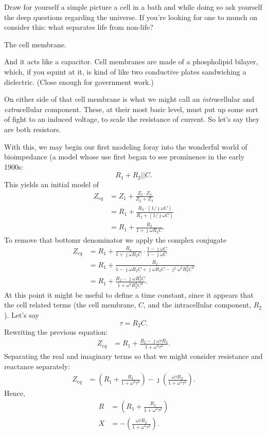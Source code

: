 \documentclass[11pt]{book}
\begin{document}
Draw for yourself a simple picture a cell in a bath and while doing so ask yourself the deep questions regarding the universe. If you're looking for one to munch on consider this: what separates life from non-life?

The cell membrane.

And it acts like a capacitor. Cell membranes are made of a phospholipid bilayer, which, if you squint at it, is kind of like two conductive plates sandwiching a dielectric. (Close enough for government work.) 

On either side of that cell membrane is what we might call an \textit{intra}cellular and \textit{extra}cellular component. These, at their most basic level, must put up some sort of fight to an induced voltage, to scale the resistance of current. So let's say they are both resistors.

With this, we may begin our first modeling foray into the wonderful world of bioimpedance (a model whose use first began to see prominence in the early 1900s: 
\begin{equation}
	R_1+R_2\vert\vert C.
\end{equation}
This yields an initial model of
\begin{align}
	Z_{eq} &= Z_1 + \frac{Z_2\cdot Z_3}{Z_2 + Z_3} \\
	&= R_1 + \frac{R_2\cdot (1/\jmath \omega C)}{R_2 + (1/\jmath \omega C)} \\
	&= R_1 + \frac{R_2}{1 + \jmath \omega R_2 C}.
\end{align}
To remove that bottomr denominator we apply the complex conjugate
\begin{align}
	Z_{eq} &= R_1 + \frac{R_2}{1 + \jmath \omega R_2 C}\cdot\frac{1-\jmath\omega C}{1 - \jmath\omega C} \\
	&= R_1 + \frac{R_2}{1 - \jmath\omega R_2 C + \jmath\omega R_2 C - \jmath^2 \omega^2 R_2^2C^2} \\
	&= R_1 + \frac{R_2 - \jmath\omega R_2^2 C}{1 + \omega^2 R_2^2 C^2}.
\end{align}
At this point it might be useful to define a time constant, since it appears that the cell related terms (the cell membrane, $C$, and the intracellular component, $R_2$). Let's say
\begin{equation}
	\tau = R_2 C.
\end{equation}
Rewriting the previous equation:
\begin{align}
	Z_{eq} &= R_1 + \frac{R_2 - \jmath\omega \tau R_2}{1 + \omega^2 \tau^2}.
\end{align}
Separating the real and imaginary terms so that we might consider resistance and reactance separately:
\begin{align}
	Z_{eq} &= \left(R_1 + \frac{R_2}{1 + \omega^2 \tau^2}\right) - \jmath\left(\frac{\omega \tau R_2}{1 + \omega^2 \tau^2}\right).
\end{align}
Hence, 
\begin{align}
	R &= \left(R_1 + \frac{R_2}{1 + \omega^2 \tau^2}\right) \\
	X &= - \left(\frac{\omega \tau R_2}{1 + \omega^2 \tau^2}\right).
\end{align}
\end{document}
